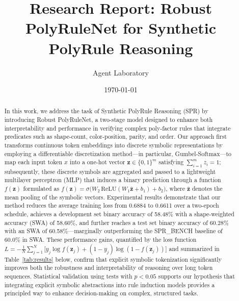 \documentclass[11pt]{article}
\begin{document}
\title{Research Report: Robust PolyRuleNet for Synthetic PolyRule Reasoning}
\author{Agent Laboratory}
\date{\today}
\maketitle

\begin{abstract}
In this work, we address the task of Synthetic PolyRule Reasoning (SPR) by introducing Robust PolyRuleNet, a two-stage model designed to enhance both interpretability and performance in verifying complex poly-factor rules that integrate predicates such as shape-count, color-position, parity, and order. Our approach first transforms continuous token embeddings into discrete symbolic representations by employing a differentiable discretization method—in particular, Gumbel-Softmax—to map each input token \( x \) into a one-hot vector \( \mathbf{z} \in \{0,1\}^m \) satisfying \( \sum_{i=1}^{m} z_i = 1 \); subsequently, these discrete symbols are aggregated and passed to a lightweight multilayer perceptron (MLP) that induces a binary prediction through a function \( f(\mathbf{z}) \) formulated as \( f(\mathbf{z}) = \sigma\big(W_2\,\text{ReLU}(W_1 \bar{\mathbf{z}} + b_1) + b_2\big) \), where \( \bar{\mathbf{z}} \) denotes the mean pooling of the symbolic vectors. Experimental results demonstrate that our method reduces the average training loss from 0.6884 to 0.6611 over a two-epoch schedule, achieves a development set binary accuracy of 58.48\% with a shape-weighted accuracy (SWA) of 58.60\%, and further reaches a test set binary accuracy of 60.28\% with an SWA of 60.58\%—marginally outperforming the SPR\_BENCH baseline of 60.0\% in SWA. These performance gains, quantified by the loss function \( L = -\frac{1}{N}\sum_{j=1}^{N} \big[y_j \log f(\mathbf{z}_j) + (1-y_j) \log (1-f(\mathbf{z}_j))\big] \) and summarized in Table~\ref{tab:results} below, confirm that explicit symbolic tokenization significantly improves both the robustness and interpretability of reasoning over long token sequences. Statistical validation using tests with \( p < 0.05 \) supports our hypothesis that integrating explicit symbolic abstractions into rule induction models provides a principled way to enhance decision-making on complex, structured tasks.
\end{abstract}
\end{document}
